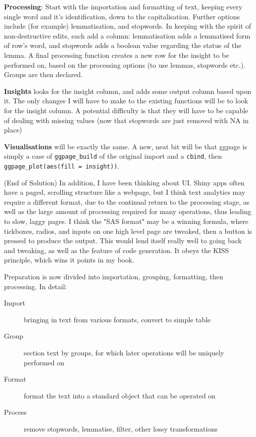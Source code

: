 \documentclass[a4paper, 11pt]{article}
\begin{document}
\textbf{Processing}: Start with the importation and formatting of text,
 keeping every single word and it's identification, down to the
 capitalisation. Further options include (for example) lemmatisation,
 and stopwords. In keeping with the spirit of non-destructive edits,
 each add a column: lemmatisation adds a lemmatised form of row's
 word, and stopwords adds a boolean value regarding the status of the
 lemma. A final processing function creates a new row for the insight to be
 performed on, based on the processing options (to use lemmas,
 stopwords etc.). Groups are then declared.

\textbf{Insights} looks for the insight column, and adds some output column
 based upon it. The only changes I will have to make to the existing
 functions will be to look for the insight column. A potential
 difficulty is that they will have to be capable of dealing with
 missing values (now that stopwords are just removed with NA in place)

\textbf{Visualisations} will be exactly the same. A new, neat bit will be
 that ggpage is simply a case of \texttt{ggpage\_build} of the original import
 and a \texttt{cbind}, then \texttt{ggpage\_plot(aes(fill = insight))}.

(End of Solution) In addition, I have been thinking about UI. Shiny
apps often have a paged, scrolling structure like a webpage, but I
think text analytics may require a different format, due to the
continual return to the processing stage, as well as the large amount
of processing required for many operations, thus leading to slow,
laggy pages. I think the "SAS format" may be a winning formula, where
tickboxes, radios, and inputs on one high level page are tweaked, then
a button is pressed to produce the output. This would lend itself
really well to going back and tweaking, as well as the feature of code
generation. It obeys the KISS principle, which wins it points in my
book. 

Preparation is now divided into importation, grouping, formatting,
then processing. In detail:
\begin{description}
\item[{Import}] bringing in text from various formats, convert to simple table
\item[{Group}] section text by groups, for which later operations will be uniquely performed on
\item[{Format}] format the text into a standard object that can be operated on
\item[{Process}] remove stopwords, lemmatise, filter, other lossy transformations
\end{description}
\end{document}

